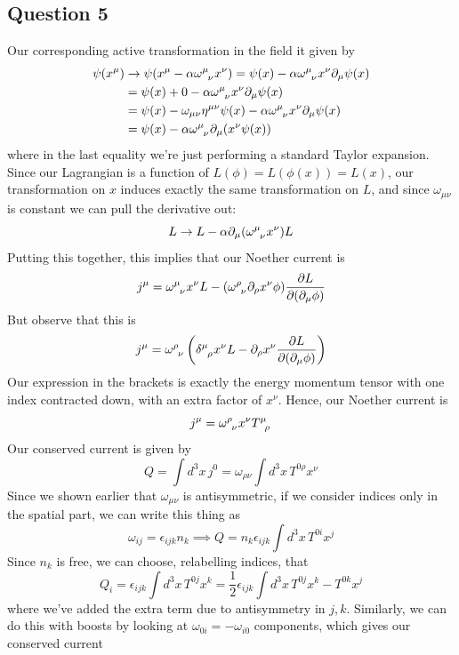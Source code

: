 \documentclass[11pt, oneside]{article}   	%
\theoremstyle{newline}
\theoremstyle{newline}
\theoremstyle{newline}
\theoremstyle{newline}
\theoremstyle{newline}
\begin{document}
\subsection{Question 5} 
Our corresponding active transformation in the field it given by 
\begin{align*} 
\psi(x^\mu)  & \rightarrow \psi(x^\mu  - \alpha \omega\indices{^\mu_ \nu}x^\nu)  = \psi( x)  - \alpha \omega\indices{^\mu_\nu} x^\nu  \partial_\mu \psi (x) \\
& =  \psi( x)  + 0  - \alpha \omega\indices{^\mu_\nu} x^\nu  \partial_\mu \psi (x)\\
&= \psi( x)  - \omega_{ \mu \nu } \eta^{\mu \nu} \psi ( x) - \alpha \omega\indices{^\mu_\nu} x^\nu  \partial_\mu \psi (x)\\
&=  \psi( x)  - \alpha \omega\indices{^\mu_\nu} \partial_\mu  (  x^\nu \psi (x)) 
\end{align*} 
where in the last equality we're just performing a standard Taylor expansion. 
Since our Lagrangian is a function of $L ( \phi) = L ( \phi(x) ) = L (x) $, our transformation on $x$ induces exactly the same transformation on $L$, and since $\omega_{ \mu\nu} $ is constant we can pull the derivative out: 
\[ 
L \rightarrow L - \alpha \partial_\mu (\omega\indices{^\mu_\nu}x^\nu ) L 
\] 
Putting this together, this implies that our Noether current is 
\[ 
j^\mu  =  \omega\indices{^\mu_\nu} x^\nu L - (\omega\indices{^\rho_\nu} \partial_\rho x^\nu \phi) \frac{ \partial L }{ \partial ( \partial_\mu \phi ) } 
\] 
But observe that this is 
\[ 
j^\mu = \omega\indices{^\rho_\nu} \left( \delta\indices{^\mu_\rho} x^\nu L  -  \partial_\rho x^\nu  \frac{ \partial L }{ \partial ( \partial_\mu \phi )} \right) 
\] 
Our expression in the brackets is exactly the energy momentum tensor with one index contracted down, with an extra factor of $x^\nu$. Hence, our Noether current is 
\[ 
j^\mu  =  \omega\indices{^\rho_\nu} x^\nu T\indices{^\mu_\rho} 
\] 
Our conserved current is given by 
\[ 
Q = \int d^3 x \, j^0 = \omega_{ \rho \nu } \int d^3 x \, T^{ 0 \rho } x^\nu 
\] 
Since we shown earlier that $\omega_{ \mu \nu } $ is antisymmetric, if we consider indices only in the spatial part, we can write this thing as 
\[ 
\omega_{ij}  = \epsilon_{ijk} n_k \implies Q = n_k \epsilon_{ijk} \int d^3 x\,  T^{0i} x^j 
\] 
Since $n_k$ is free, we can choose, relabelling indices, that 
\[ 
Q_i =  \epsilon_{ ijk} \int d^3 x \, T^{ 0j} x^k = \frac{1}{2} \epsilon_{ ijk} \int d^3 x \, T^{ 0j} x^k - T^{ 0k } x^j 
\] 
where we've added the extra term due to antisymmetry in $j, k$. 
Similarly, we can do this with boosts by looking at $\omega_{ 0i} =  - \omega_{ i0} $ components, which gives our conserved current 
\end{document}
